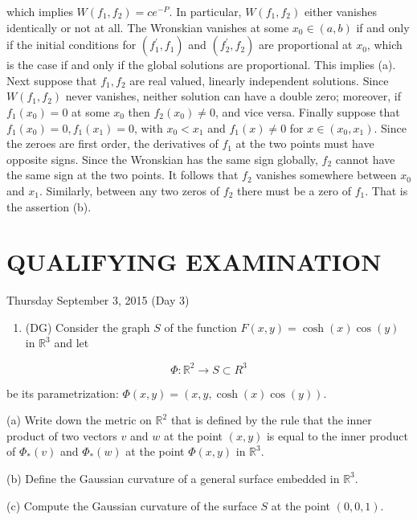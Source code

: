 \documentclass[10pt]{article}
\begin{document}
which implies $W\left(f_{1}, f_{2}\right)=c e^{-P}$. In particular, $W\left(f_{1}, f_{2}\right)$ either vanishes identically or not at all. The Wronskian vanishes at some $x_{0} \in(a, b)$ if and only if the initial conditions for $\left(f_{1}^{\prime}, f_{1}\right)$ and $\left(f_{2}^{\prime}, f_{2}\right)$ are proportional at $x_{0}$, which is the case if and only if the global solutions are proportional. This implies (a). Next suppose that $f_{1}, f_{2}$ are real valued, linearly independent solutions. Since $W\left(f_{1}, f_{2}\right)$ never vanishes, neither solution can have a double zero; moreover, if $f_{1}\left(x_{0}\right)=0$ at some $x_{0}$ then $f_{2}\left(x_{0}\right) \neq 0$, and vice versa. Finally suppose that $f_{1}\left(x_{0}\right)=0, f_{1}\left(x_{1}\right)=0$, with $x_{0}<x_{1}$ and $f_{1}(x) \neq 0$ for $x \in\left(x_{0}, x_{1}\right)$. Since the zeroes are first order, the derivatives of $f_{1}$ at the
two points must have opposite signs. Since the Wronskian has the same sign globally, $f_{2}$ cannot have the same sign at the two points. It follows that $f_{2}$ vanishes somewhere between $x_{0}$ and $x_{1}$. Similarly, between any two zeros of $f_{2}$ there must be a zero of $f_{1}$. That is the assertion (b).

\section*{QUALIFYING EXAMINATION }
Thursday September 3, 2015 (Day 3)

\begin{enumerate}
  \item (DG) Consider the graph $S$ of the function $F(x, y)=\cosh (x) \cos (y)$ in $\mathbb{R}^{3}$ and let
\end{enumerate}

$$
\Phi: \mathbb{R}^{2} \rightarrow S \subset R^{3}
$$

be its parametrization: $\Phi(x, y)=(x, y, \cosh (x) \cos (y))$.

(a) Write down the metric on $\mathbb{R}^{2}$ that is defined by the rule that the inner product of two vectors $v$ and $w$ at the point $(x, y)$ is equal to the inner product of $\Phi_{*}(v)$ and $\Phi_{*}(w)$ at the point $\Phi(x, y)$ in $\mathbb{R}^{3}$.

(b) Define the Gaussian curvature of a general surface embedded in $\mathbb{R}^{3}$.

(c) Compute the Gaussian curvature of the surface $S$ at the point $(0,0,1)$.
\end{document}
